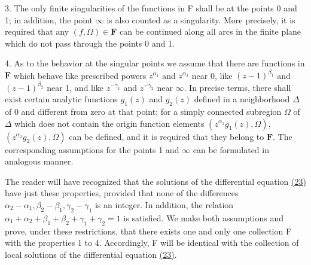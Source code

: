 3. The only finite singularities of the functions in F shall be at the
points 0 and 1; in addition, the point $\infty$ is also counted as a singularity. More precisely, it is required that any $(f,\Omega)\in\mathbf{F}$ can be continued along all arcs in the finite plane which do not pass through the points 0 and 1.

4. As to the behavior at the singular points we assume that there are functions in $\mathbf{F}$ which behave like prescribed powers $z^{\alpha_1}$ and $z^{\alpha_2}$ near 0, like $(z - 1)^{\beta_1}$ and $(z - 1)^{\beta_2}$ near 1, and like $z^{-\gamma_1}$ and $z^{-\gamma_2}$ near $\infty$. In precise terms, there shall exist certain analytic functions $g_1(z)$ and $g_2(z)$ defined in a neighborhood $\Delta$ of 0 and different from zero at that point; for a simply connected subregion $\Omega$ of $\Delta$ which does not contain the origin function elements $(z^{\alpha_1}g_1(z),\Omega)$, $(z^{\alpha_2}g_2(z),\Omega)$ can be defined, and it is required that they belong to $\mathbf{F}$. The corresponding assumptions for the points 1 and $\infty$ can be formulated in analogous manner.

The reader will have recognized that the solutions of the differential equation \hyperref[eq:8.23]{(23)} have just these properties, provided that none of the differences $\alpha_{2}-\alpha_{1},\beta_{2}-\beta_{1},\gamma_{2}-\gamma_{1}$ is an integer. In addition, the relation $\alpha_{1}+\alpha_{2}+\beta_{1}+\beta_{2}+\gamma_{1}+\gamma_{2}=1$ is satisfied. We make both assumptions and prove, under these restrictions, that there exists one and only one collection F with the properties 1 to 4. Accordingly, F will be identical with the collection of local solutions of the differential equation \hyperref[eq:8.23]{(23)}.

